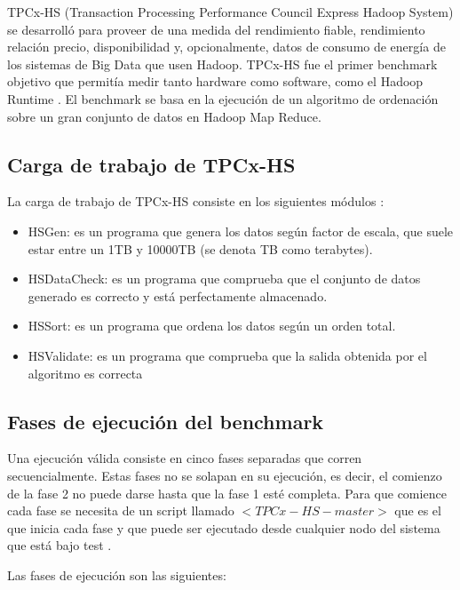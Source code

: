 \documentclass[10pt]{article}
\begin{document}
	TPCx-HS (Transaction Processing Performance Council Express Hadoop System) se desarrolló para proveer de una medida del rendimiento fiable, rendimiento relación precio, disponibilidad y, opcionalmente, datos de consumo de energía de los sistemas de Big Data que usen Hadoop. TPCx-HS fue el primer benchmark objetivo que permitía medir tanto hardware como software, como el Hadoop Runtime \cite{info-tpc}. El benchmark se basa en la ejecución de un algoritmo de ordenación sobre un gran conjunto de datos en Hadoop Map Reduce.
	
	\subsection{Carga de trabajo de TPCx-HS}
	
		La carga de trabajo de TPCx-HS consiste en los siguientes módulos \cite{tpcxhs}:
		
		\begin{itemize}
			\item HSGen: es un programa que genera los datos según factor de escala, que suele estar entre un 1TB y 10000TB (se denota TB como terabytes).
			\item HSDataCheck: es un programa que comprueba que el conjunto de datos generado es correcto y está perfectamente almacenado.
			\item HSSort: es un programa que ordena los datos según un orden total.
			\item HSValidate: es un programa que comprueba que la salida obtenida por el algoritmo es correcta
		\end{itemize}
	
	\subsection{Fases de ejecución del benchmark}
	
		Una ejecución válida consiste en cinco fases separadas que corren secuencialmente. Estas fases no se solapan en su ejecución, es decir, el comienzo de la fase 2 no puede darse hasta que la fase 1 esté completa. Para que comience cada fase se necesita de un script llamado $<TPCx-HS-master>$ que es el que inicia cada fase y que puede ser ejecutado desde cualquier nodo del sistema que está bajo test \cite{tpcxhs}.
		
		Las fases de ejecución son las siguientes:
		
\end{document}
